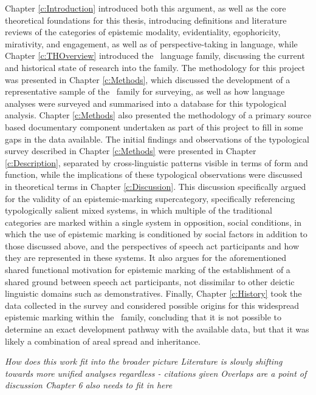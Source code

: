 Chapter \ref{c:Introduction} introduced both this argument, as well as the core theoretical foundations for this thesis, introducing definitions and literature reviews of the categories of epistemic modality, evidentiality, egophoricity, mirativity, and engagement, as well as of perspective-taking in language, while Chapter \ref{c:THOverview} introduced the \lfam\ language family, discussing the current and historical state of research into the family. The methodology for this project was presented in Chapter \ref{c:Methods}, which discussed the development of a representative sample of the \lfam\ family for surveying, as well as how language analyses were surveyed and summarised into a database for this typological analysis. Chapter \ref{c:Methods} also presented the methodology of a primary source based documentary component undertaken as part of this project to fill in some gaps in the data available. The initial findings and observations of the typological survey described in Chapter \ref{c:Methods} were presented in Chapter \ref{c:Description}, separated by cross-linguistic patterns visible in terms of form and function, while the implications of these typological observations were discussed in theoretical terms in Chapter \ref{c:Discussion}. This discussion specifically argued for the validity of an epistemic-marking supercategory, specifically referencing typologically salient mixed systems, in which multiple of the traditional categories are marked within a single system in opposition, social conditions, in which the use of epistemic marking is conditioned by social factors in addition to those discussed above, and the perspectives of speech act participants and how they are represented in these systems. It also argues for the aforementioned shared functional motivation for epistemic marking of the establishment of a shared ground between speech act participants, not dissimilar to other deictic linguistic domains such as demonstratives. Finally, Chapter \ref{c:History} took the data collected in the survey and considered possible origins for this widespread epistemic marking within the \lfam\ family, concluding that it is not possible to determine an exact development pathway with the available data, but that it was likely a combination of areal spread and inheritance.


\textit{How does this work fit into the broader picture
Literature is slowly shifting towards more unified analyses regardless - citations given
Overlaps are a point of discussion
Chapter 6 also needs to fit in here}

